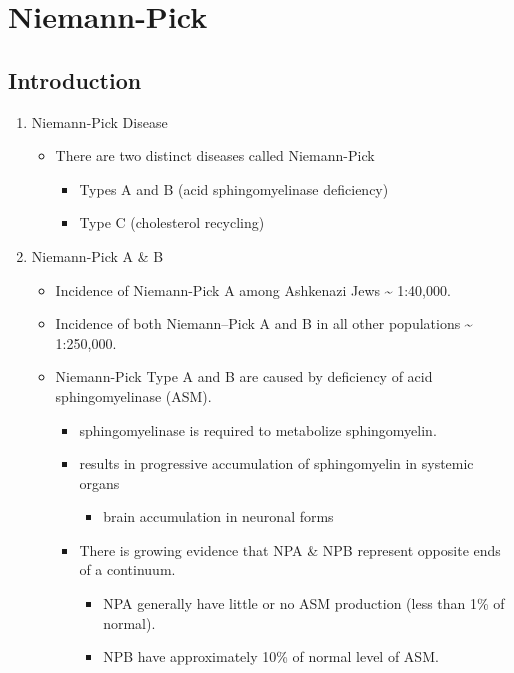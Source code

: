 \documentclass{scrartcl}
\begin{document}
\section{Niemann-Pick}
\label{sec:org5d8cdb1}
\subsection{Introduction}
\label{sec:org619707a}

\begin{enumerate}
\item Niemann-Pick Disease
\label{sec:orgc8a9f2c}
\begin{itemize}
\item There are two distinct diseases called Niemann-Pick
\begin{itemize}
\item Types A and B (acid sphingomyelinase deficiency)
\item Type C (cholesterol recycling)
\end{itemize}
\end{itemize}

\item Niemann-Pick A \& B
\label{sec:org9b92dfd}
\begin{itemize}
\item Incidence of Niemann-Pick A among Ashkenazi Jews \textasciitilde{} 1:40,000.
\item Incidence of both Niemann–Pick A and B in all other populations \textasciitilde{} 1:250,000.
\item Niemann-Pick Type A and B are caused by deficiency of acid sphingomyelinase (ASM).
\begin{itemize}
\item sphingomyelinase is required to metabolize sphingomyelin.
\item results in progressive accumulation of sphingomyelin in systemic organs
\begin{itemize}
\item brain accumulation in neuronal forms
\end{itemize}
\item There is growing evidence that NPA \& NPB represent opposite ends of a continuum.
\begin{itemize}
\item NPA generally have little or no ASM production (less than 1\% of normal).
\item NPB have approximately 10\% of normal level of ASM.
\end{itemize}
\end{itemize}
\end{itemize}


\end{enumerate}
\end{document}
